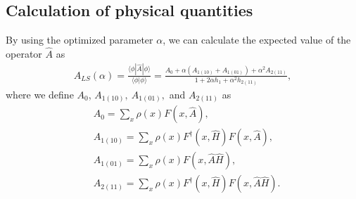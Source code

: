 \subsection{Calculation of physical quantities}
 By using the optimized parameter $\alpha$, we can calculate the expected value of the operator $\hat{A}$ as 
\begin{align}
A_{LS}(\alpha) =\frac{\langle \phi| \hat{A} |\phi\rangle}{\langle \phi|\phi\rangle}=\frac{A_0 + \alpha(A_{1(10)} + A_{1(01)}) + \alpha^2 A_{2(11)}}{1 + 2\alpha h_1 + \alpha^2 h_{2(11)}},
\end{align}
where we define $A_0$, $A_{1(10)},~A_{1(01)},$ and $A_{2(11)}$ as
\begin{align}
&A_0 =\sum_{x} \rho(x) F(x,  \hat{A}),\\
&A_{1(10)}=\sum_{x} \rho(x) F^{\dag}(x,  \hat{H}) F(x, \hat{A}),\\
&A_{1(01)}=\sum_{x} \rho(x) F(x, \hat{A}\hat{H}),\\
&A_{2(11)}=\sum_{x} \rho(x) F^{\dag}(x,  \hat{H})F(x,  \hat{A}\hat{H}).
\end{align}

